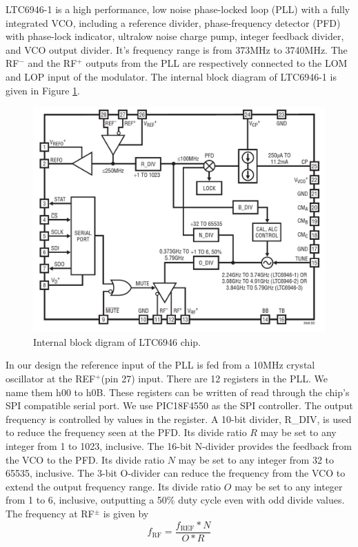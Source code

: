 \documentclass[a4paper,10pt]{article}
\begin{document}
LTC6946-1\cite{bib:pllchip} is a high performance, low noise phase-locked loop (PLL) with a fully integrated VCO,
including a reference divider, phase-frequency detector (PFD) with phase-lock indicator,
ultralow noise charge pump, integer feedback divider, and VCO output divider.
It's frequency range is from 373MHz to 3740MHz.
The RF$^-$ and the RF$^+$ outputs from the PLL are respectively connected to the LOM and LOP input of the modulator.
The internal block diagram of LTC6946-1 is given in Figure \ref{fig:pll-block}.
\begin{figure}
\centering
\includegraphics[scale=0.4]{figures/pll-block-diagram.jpg}
\caption{Internal block digram of LTC6946 chip. \label{fig:pll-block}}
\end{figure}

In our design the reference input of the PLL is fed from a 10MHz crystal oscillator at the REF$^+$(pin 27) input.
There are 12 registers in the PLL. We name them h00 to h0B.
These registers can be written of read through the chip's SPI compatible serial port.
We use PIC18F4550 as the SPI controller.
The output frequency is controlled by values in the register.
A 10-bit divider, R\_DIV, is used to reduce the frequency seen at the PFD.
Its divide ratio $R$ may be set to any integer from 1 to 1023, inclusive.
The 16-bit N-divider provides the feedback from the VCO to the PFD.
Its divide ratio $N$ may be set to any integer from 32 to 65535, inclusive.
The 3-bit O-divider can reduce the frequency from the VCO
to extend the output frequency range. Its divide ratio $O$
may be set to any integer from 1 to 6, inclusive, outputting a 50\% duty cycle even with odd divide values.
The frequency at RF$^\pm$ is given by
\begin{equation}
 f_{\text{RF}} = \frac{f_{\text{REF}}*N}{O*R}
\end{equation}
\end{document}
